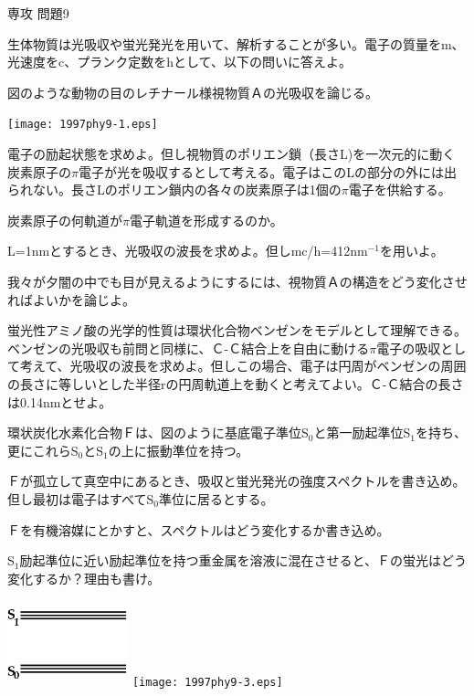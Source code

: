 \documentclass[fleqn]{jbook}
\begin{document}
\begin{question}{専攻 問題9}{}

生体物質は光吸収や蛍光発光を用いて、解析することが多い。電子の質量をm、光速度をc、プランク定数をhとして、以下の問いに答えよ。

\begin{subquestions}
\SubQuestion
図のような動物の目のレチナール様視物質Ａの光吸収を論じる。

\begin{center}
\texttt{[image: 1997phy9-1.eps]}
\end{center}

\begin{subsubquestions}
\SubSubQuestion
電子の励起状態を求めよ。但し視物質のポリエン鎖（長さL)を一次元的に動く炭素原子の$\pi$電子が光を吸収するとして考える。電子はこのLの部分の外には出られない。長さLのポリエン鎖内の各々の炭素原子は1個の$\pi$電子を供給する。

\SubSubQuestion
炭素原子の何軌道が$\pi$電子軌道を形成するのか。

\SubSubQuestion
L=1nmとするとき、光吸収の波長を求めよ。但しmc/h=412nm$^{-1}$を用いよ。

\SubSubQuestion
我々が夕闇の中でも目が見えるようにするには、視物質Ａの構造をどう変化させればよいかを論じよ。
\end{subsubquestions}

\SubQuestion
蛍光性アミノ酸の光学的性質は環状化合物ベンゼンをモデルとして理解できる。ベンゼンの光吸収も前問と同様に、Ｃ-Ｃ結合上を自由に動ける$\pi$電子の吸収として考えて、光吸収の波長を求めよ。但しこの場合、電子は円周がベンゼンの周囲の長さに等しいとした半径rの円周軌道上を動くと考えてよい。Ｃ-Ｃ結合の長さは0.14nmとせよ。

\SubQuestion
環状炭化水素化合物Ｆは、図のように基底電子準位S$_0$と第一励起準位S$_1$を持ち、更にこれらS$_0$とS$_1$の上に振動準位を持つ。

\begin{subsubquestions}
\SubSubQuestion
Ｆが孤立して真空中にあるとき、吸収と蛍光発光の強度スペクトルを書き込め。但し最初は電子はすべてS$_0$準位に居るとする。

\SubSubQuestion
Ｆを有機溶媒にとかすと、スペクトルはどう変化するか書き込め。

\SubSubQuestion
S$_1$励起準位に近い励起準位を持つ重金属を溶液に混在させると、Ｆの蛍光はどう変化するか？理由も書け。
\vspace{5mm}
\begin{center}
\includegraphics[clip,height=25mm,width=35mm]{1997phy9-2.eps}
\hspace{20mm}
\texttt{[image: 1997phy9-3.eps]}
\end{center}
\end{subsubquestions}


\end{subquestions}
\end{question}
\end{document}
